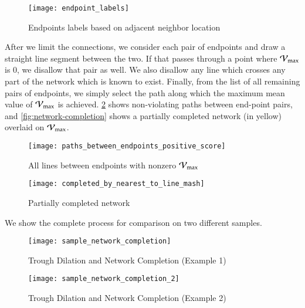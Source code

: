 \begin{figure}
	\texttt{[image: endpoint\_labels]}
	\caption{Endpoints labels based on adjacent neighbor location}
	\label{fig:endpoint_labels}
\end{figure}

After we limit the connections, we consider each pair of endpoints and draw a straight line segment between the two. If that passes through a point where $\mathcal{V}_{\max}$ is 0, we disallow that pair as well. We also disallow any line which crosses any part of the network which is known to exist.
Finally, from the list of all remaining pairs of endpoints, we simply select the path along which the maximum mean value of $\mathcal{V}_{\max}$ is achieved. \cref{fig:network-completion-all-pairs} shows non-violating paths between end-point pairs, and \cref{fig:network-completion} shows a partially completed network (in yellow) overlaid on $\mathcal{V}_{\max}$.



\begin{figure}
	\texttt{[image: paths\_between\_endpoints\_positive\_score]}
	\caption{All lines between endpoints with nonzero $\mathcal{V}_{\max}$}
	\label{fig:network-completion-all-pairs}
\end{figure}
\begin{figure}
	\texttt{[image: completed\_by\_nearest\_to\_line\_mash]}
	\caption{Partially completed network}
	\label{fig:network-completion-end-result}
\end{figure}

We show the complete process for comparison on two different samples. 

\begin{figure}
	\texttt{[image: sample\_network\_completion]}
	\caption{Trough Dilation and Network Completion (Example 1)}
	\label{fig:network-completion-demo-1}
\end{figure}
\begin{figure}
	\texttt{[image: sample\_network\_completion\_2]}
	\caption{Trough Dilation and Network Completion (Example 2)}
	\label{fig:network-completion-demo-2}
\end{figure}


